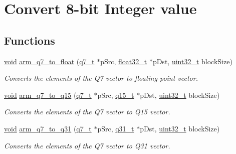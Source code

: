 \hypertarget{group__q7__to__x}{\section{Convert 8-\/bit Integer value}
\label{group__q7__to__x}
}
\subsection*{Functions}
\begin{DoxyCompactItemize}
\item 
\hyperlink{group___n_a_m_e_ga18028b8badbf1ea7e704ccac3c488e82}{void} \hyperlink{group__q7__to__x_ga656620f957b65512ed83db03fd455ec5}{arm\-\_\-q7\-\_\-to\-\_\-float} (\hyperlink{arm__math_8h_ae541b6f232c305361e9b416fc9eed263}{q7\-\_\-t} $\ast$p\-Src, \hyperlink{arm__math_8h_a4611b605e45ab401f02cab15c5e38715}{float32\-\_\-t} $\ast$p\-Dst, \hyperlink{stdint_8h_a435d1572bf3f880d55459d9805097f62}{uint32\-\_\-t} block\-Size)
\begin{DoxyCompactList}\small\item\em Converts the elements of the Q7 vector to floating-\/point vector. \end{DoxyCompactList}\item 
\hyperlink{group___n_a_m_e_ga18028b8badbf1ea7e704ccac3c488e82}{void} \hyperlink{group__q7__to__x_gabc02597fc3f01033daf43ec0547a2f78}{arm\-\_\-q7\-\_\-to\-\_\-q15} (\hyperlink{arm__math_8h_ae541b6f232c305361e9b416fc9eed263}{q7\-\_\-t} $\ast$p\-Src, \hyperlink{arm__math_8h_ab5a8fb21a5b3b983d5f54f31614052ea}{q15\-\_\-t} $\ast$p\-Dst, \hyperlink{stdint_8h_a435d1572bf3f880d55459d9805097f62}{uint32\-\_\-t} block\-Size)
\begin{DoxyCompactList}\small\item\em Converts the elements of the Q7 vector to Q15 vector. \end{DoxyCompactList}\item 
\hyperlink{group___n_a_m_e_ga18028b8badbf1ea7e704ccac3c488e82}{void} \hyperlink{group__q7__to__x_gad8958cd3cb7f521466168b46a25b7908}{arm\-\_\-q7\-\_\-to\-\_\-q31} (\hyperlink{arm__math_8h_ae541b6f232c305361e9b416fc9eed263}{q7\-\_\-t} $\ast$p\-Src, \hyperlink{arm__math_8h_adc89a3547f5324b7b3b95adec3806bc0}{q31\-\_\-t} $\ast$p\-Dst, \hyperlink{stdint_8h_a435d1572bf3f880d55459d9805097f62}{uint32\-\_\-t} block\-Size)
\begin{DoxyCompactList}\small\item\em Converts the elements of the Q7 vector to Q31 vector. \end{DoxyCompactList}\end{DoxyCompactItemize}


